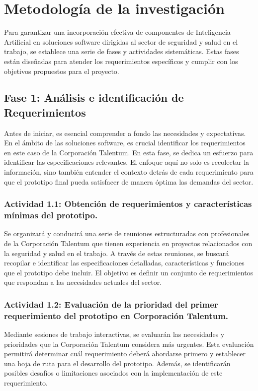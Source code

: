 \section{Metodología de la investigación}

Para garantizar una incorporación efectiva de componentes de Inteligencia Artificial en soluciones software dirigidas al sector de seguridad y salud en el trabajo, se establece una serie de fases y actividades sistemáticas. Estas fases están diseñadas para atender los requerimientos específicos y cumplir con los objetivos propuestos para el proyecto.

\subsection{Fase 1: Análisis e identificación de Requerimientos}
Antes de iniciar, es esencial comprender a fondo las necesidades y expectativas. En el ámbito de las soluciones software, es crucial identificar los requerimientos en este caso de la Corporación Talentum. En esta fase, se dedica un esfuerzo para identificar las especificaciones relevantes. El enfoque aquí no solo es recolectar la información, sino también entender el contexto detrás de cada requerimiento para que el prototipo final pueda satisfacer de manera óptima las demandas del sector.

\subsubsection{Actividad 1.1: Obtención de requerimientos y características mínimas del prototipo.}
Se organizará y conducirá una serie de reuniones estructuradas con profesionales de la Corporación Talentum que tienen experiencia en proyectos relacionados con la seguridad y salud en el trabajo. A través de estas reuniones, se buscará recopilar e identificar las especificaciones detalladas, características y funciones que el prototipo debe incluir. El objetivo es definir un conjunto de requerimientos que respondan a las necesidades actuales del sector.

\subsubsection{Actividad 1.2: Evaluación de la prioridad del primer requerimiento del prototipo en Corporación Talentum.}
Mediante sesiones de trabajo interactivas, se evaluarán las necesidades y prioridades que la Corporación Talentum considera más urgentes. Esta evaluación permitirá determinar cuál requerimiento deberá abordarse primero y establecer una hoja de ruta para el desarrollo del prototipo. Además, se identificarán posibles desafíos o limitaciones asociados con la implementación de este requerimiento.

